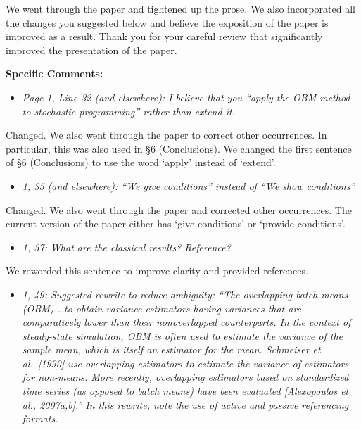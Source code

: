 \documentclass[11pt,notitlepage,onecolumn]{article}
\newcommand{\noi}{\noindent}
\begin{document}
\noindent  
We went through the paper and tightened up the prose. 
We also incorporated all the changes you suggested below and believe the exposition of the paper is improved as a result.
Thank you for your careful review that significantly improved the presentation of the paper. 
\medskip 

\bigskip 


\noi  
{\large \bf Specific Comments:}
\medskip 


\begin{itemize}
\item[] \textit{Page 1, Line 32 (and elsewhere): I believe that you ``apply the OBM method to stochastic programming'' rather than extend it.}
\end{itemize}

\noi
Changed.  
We also went through the paper to correct other occurrences. 
In particular, this was also used in \S 6 (Conclusions). 
We changed the first sentence of \S 6 (Conclusions) to use the word `apply' instead of `extend'. 
\medskip 


\begin{itemize}
\item[] \textit{1, 35 (and elsewhere): ``We give conditions'' instead of ``We show conditions''}
\end{itemize}

\noi
Changed. 
We also went through the paper and corrected other occurrences. 
The current version of the paper either has `give conditions' or `provide conditions'. 
\medskip 


\begin{itemize}
\item[] \textit{1, 37: What are the classical results? Reference?}
\end{itemize}

\noi
We reworded this sentence to improve clarity and provided references.   
\medskip 



\begin{itemize}
\item[] \textit{1, 49: Suggested rewrite to reduce ambiguity: ``The overlapping batch means (OBM) \ldots to obtain variance estimators having variances that are comparatively lower than their nonoverlapped counterparts. 
In the context of steady-state simulation, OBM is often used to estimate the variance of the sample mean, which is itself an estimator for the mean. 
Schmeiser et al.\ [1990] use overlapping estimators to estimate the
variance of estimators for non-means. 
More recently, overlapping estimators based on standardized time series (as opposed to batch means) have been evaluated [Alexopoulos et al., 2007a,b].'' 
In this rewrite, note the use of active and passive referencing formats.}
\end{itemize}
\end{document}
